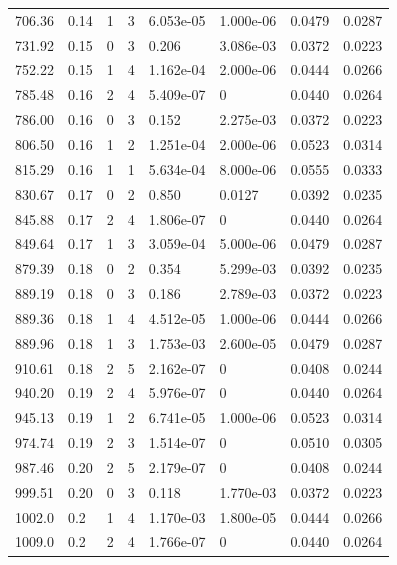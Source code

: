 \documentclass[preview]{standalone}
\begin{document}
{{{\begin{tabular}{L{1.2cm}C{1.2cm} C{0.3cm}C{0.5cm} C{1.4cm}C{1.4cm} C{1.4cm}C{1.4cm}}
  706.36  &  0.14  & 1     &  3 &  6.053e-05  & 1.000e-06  & 0.0479 &  0.0287   \\ 
  731.92  &  0.15  & 0     &  3 &  0.206  & 3.086e-03  & 0.0372 &  0.0223   \\ 
  752.22  &  0.15  & 1     &  4 &  1.162e-04  & 2.000e-06  & 0.0444 &  0.0266   \\ 
  785.48  &  0.16  & 2     &  4 &  5.409e-07  & 0  & 0.0440 &  0.0264   \\ 
  786.00  &  0.16  & 0     &  3 &  0.152  & 2.275e-03  & 0.0372 &  0.0223   \\ 
  806.50  &  0.16  & 1     &  2 &  1.251e-04  & 2.000e-06  & 0.0523 &  0.0314   \\ 
  815.29  &  0.16  & 1     &  1 &  5.634e-04  & 8.000e-06  & 0.0555 &  0.0333   \\ 
  830.67  &  0.17  & 0     &  2 &  0.850  & 0.0127  & 0.0392 &  0.0235   \\ 
  845.88  &  0.17  & 2     &  4 &  1.806e-07  & 0  & 0.0440 &  0.0264   \\ 
  849.64  &  0.17  & 1     &  3 &  3.059e-04  & 5.000e-06  & 0.0479 &  0.0287   \\ 
  879.39  &  0.18  & 0     &  2 &  0.354  & 5.299e-03  & 0.0392 &  0.0235   \\ 
  889.19  &  0.18  & 0     &  3 &  0.186  & 2.789e-03  & 0.0372 &  0.0223   \\ 
  889.36  &  0.18  & 1     &  4 &  4.512e-05  & 1.000e-06  & 0.0444 &  0.0266   \\ 
  889.96  &  0.18  & 1     &  3 &  1.753e-03  & 2.600e-05  & 0.0479 &  0.0287   \\ 
  910.61  &  0.18  & 2     &  5 &  2.162e-07  & 0  & 0.0408 &  0.0244   \\ 
  940.20  &  0.19  & 2     &  4 &  5.976e-07  & 0  & 0.0440 &  0.0264   \\ 
  945.13  &  0.19  & 1     &  2 &  6.741e-05  & 1.000e-06  & 0.0523 &  0.0314   \\ 
  974.74  &  0.19  & 2     &  3 &  1.514e-07  & 0  & 0.0510 &  0.0305   \\ 
  987.46  &  0.20  & 2     &  5 &  2.179e-07  & 0  & 0.0408 &  0.0244   \\ 
  999.51  &  0.20  & 0     &  3 &  0.118  & 1.770e-03  & 0.0372 &  0.0223   \\ 
  1002.0  &   0.2  & 1     &  4 &  1.170e-03  & 1.800e-05  & 0.0444 &  0.0266   \\ 
  1009.0  &   0.2  & 2     &  4 &  1.766e-07  & 0  & 0.0440 &  0.0264   \\ 

\end{tabular}}}}
\end{document}
